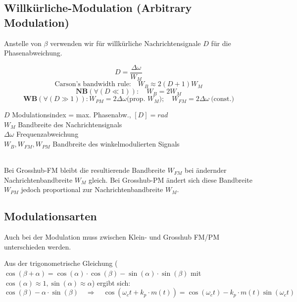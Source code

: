 \subsection{Willkürliche-Modulation (Arbitrary Modulation) }
Anstelle von $\beta$ verwenden wir für willkürliche Nachrichtensignale $D$ für die
Phasenabweichung.\\ 
\begin{minipage}[t][2.7cm][c]{10cm}
	$$ D = \frac{\Delta \omega}{W_M} $$	
$$\text{Carson's bandwidth rule:} \quad W_B \approx 2(D + 1) W_M $$ 
$$ \textbf{NB}(\forall (D \ll 1)): \quad W_{B} = 2 W_M $$ 
$$ \textbf{WB} (\forall (D \gg 1)): W_{PM} = 2 \Delta \omega \text{(prop. $W_M$)};
 \quad W_{FM} = 2 \Delta \omega ~\text{(const.)} $$
\end{minipage} \hspace{0.6cm}
\begin{minipage}[t][2.7cm][c]{8cm} 
	$D$ Modulationsindex = max. Phasenabw., $[D] = rad$ \\
	$W_M$ Bandbreite des Nachrichtensignals \\
	$\Delta \omega$ Frequenzabweichung \\
	$W_B,W_{FM},W_{PM}$ Bandbreite des winkelmodulierten Signals
\end{minipage} \\
Bei Grosshub-FM bleibt die resultierende Bandbreite $W_{FM}$ bei ändernder Nachrichtenbandbreite
$W_M$ gleich. Bei Grosshub-PM ändert sich diese Bandbreite$W_{PM}$ jedoch proportional zur
Nachrichtenbandbreite $W_M$.\\


\subsection{Modulationsarten}
Auch bei der Modulation muss zwischen Klein- und Grosshub FM/PM unterschieden werden.


Aus der trigonometrische Gleichung ($\cos(\beta + \alpha) = \cos(\alpha) \cdot \cos(\beta) -
\sin(\alpha) \cdot \sin(\beta)$ mit $\cos(\alpha) \approx 1, \sin(\alpha) \approx \alpha$) ergibt
sich: \\
$$\cos(\beta) - \alpha \cdot \sin(\beta) \quad \Rightarrow \quad \cos(\omega_c t + k_p \cdot m(t))
= \cos(\omega_c t) - k_p \cdot m(t) \sin(\omega_c t)$$


